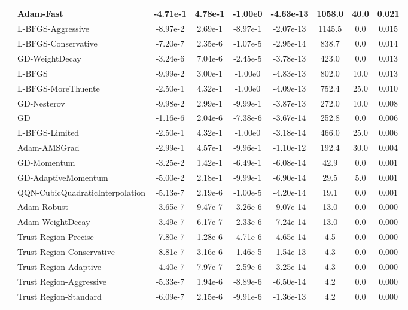 \documentclass[10pt]{article}
\begin{document}
\begin{longtable}{|l|l|c|c|c|c|c|c|c|}
\hline
 & Adam-Fast & -4.71e-1 & 4.78e-1 & -1.00e0 & -4.63e-13 & 1058.0 & 40.0 & 0.021 \\
\hline
 & L-BFGS-Aggressive & -8.97e-2 & 2.69e-1 & -8.97e-1 & -2.07e-13 & 1145.5 & 0.0 & 0.015 \\
\hline
 & L-BFGS-Conservative & -7.20e-7 & 2.35e-6 & -1.07e-5 & -2.95e-14 & 838.7 & 0.0 & 0.014 \\
\hline
 & GD-WeightDecay & -3.24e-6 & 7.04e-6 & -2.45e-5 & -3.78e-13 & 423.0 & 0.0 & 0.013 \\
\hline
 & L-BFGS & -9.99e-2 & 3.00e-1 & -1.00e0 & -4.83e-13 & 802.0 & 10.0 & 0.013 \\
\hline
 & L-BFGS-MoreThuente & -2.50e-1 & 4.32e-1 & -1.00e0 & -4.09e-13 & 752.4 & 25.0 & 0.010 \\
\hline
 & GD-Nesterov & -9.98e-2 & 2.99e-1 & -9.99e-1 & -3.87e-13 & 272.0 & 10.0 & 0.008 \\
\hline
 & GD & -1.16e-6 & 2.04e-6 & -7.38e-6 & -3.67e-14 & 252.8 & 0.0 & 0.006 \\
\hline
 & L-BFGS-Limited & -2.50e-1 & 4.32e-1 & -1.00e0 & -3.18e-14 & 466.0 & 25.0 & 0.006 \\
\hline
 & Adam-AMSGrad & -2.99e-1 & 4.57e-1 & -9.96e-1 & -1.10e-12 & 192.4 & 30.0 & 0.004 \\
\hline
 & GD-Momentum & -3.25e-2 & 1.42e-1 & -6.49e-1 & -6.08e-14 & 42.9 & 0.0 & 0.001 \\
\hline
 & GD-AdaptiveMomentum & -5.00e-2 & 2.18e-1 & -9.99e-1 & -6.90e-14 & 29.5 & 5.0 & 0.001 \\
\hline
 & QQN-CubicQuadraticInterpolation & -5.13e-7 & 2.19e-6 & -1.00e-5 & -4.20e-14 & 19.1 & 0.0 & 0.001 \\
\hline
 & Adam-Robust & -3.65e-7 & 9.47e-7 & -3.26e-6 & -9.07e-14 & 13.0 & 0.0 & 0.000 \\
\hline
 & Adam-WeightDecay & -3.49e-7 & 6.17e-7 & -2.33e-6 & -7.24e-14 & 13.0 & 0.0 & 0.000 \\
\hline
 & Trust Region-Precise & -7.80e-7 & 1.28e-6 & -4.71e-6 & -4.65e-14 & 4.5 & 0.0 & 0.000 \\
\hline
 & Trust Region-Conservative & -8.81e-7 & 3.16e-6 & -1.46e-5 & -1.54e-13 & 4.3 & 0.0 & 0.000 \\
\hline
 & Trust Region-Adaptive & -4.40e-7 & 7.97e-7 & -2.59e-6 & -3.25e-14 & 4.3 & 0.0 & 0.000 \\
\hline
 & Trust Region-Aggressive & -5.33e-7 & 1.94e-6 & -8.89e-6 & -6.50e-14 & 4.2 & 0.0 & 0.000 \\
\hline
 & Trust Region-Standard & -6.09e-7 & 2.15e-6 & -9.91e-6 & -1.36e-13 & 4.2 & 0.0 & 0.000 \\

\end{longtable}
\end{document}
